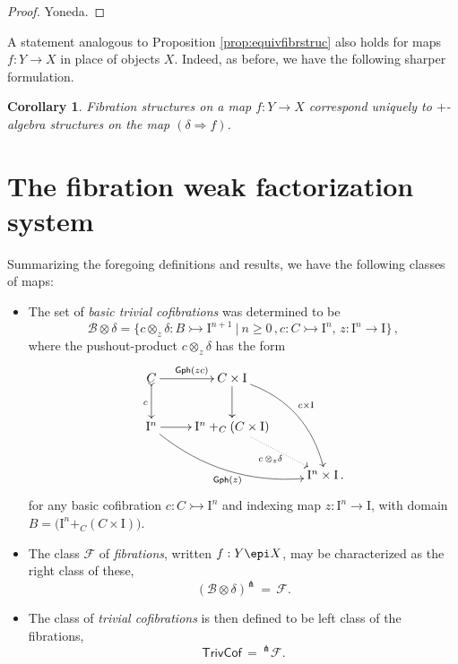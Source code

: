 \documentclass[11pt]{article}
\newcommand{\mono}{\ensuremath{\rightarrowtail}}
\newcommand{\I}{\ensuremath{\mathrm{I}}}
\newtheorem{corollary}[theorem]{Corollary}
\theoremstyle{remark}
\theoremstyle{definition}
\begin{document}
\begin{proof}
Yoneda.
\end{proof}


A statement analogous to Proposition \ref{prop:equivfibrstruc} also holds for maps $f:Y\to X$ in place of objects $X$.  Indeed, as before, we have the following sharper formulation.

\begin{corollary}
Fibration structures on a map $f : Y\to X$ correspond uniquely to $+$-algebra structures on the map $(\delta\Rightarrow{f})$.
\end{corollary}

\section{The fibration weak factorization system}

Summarizing the foregoing definitions and results, we have the following classes of maps:

\begin{itemize}
\item  The set of \emph{basic trivial cofibrations} was determined to be
\begin{equation}\label{eq:basicunbiasedtrivcof}
\mathcal{B}\otimes\delta = \{c \otimes_z \delta : B \mono \I^{n+1}\ |\ n\geq 0\,, c : C\mono \I^n,\, z : \I^n \to \I\}\,,
\end{equation}
where the pushout-product $c\otimes_z \delta$ has the form
\begin{equation}\label{diagram:unbiasedbasicpushoutproduct2}
\xymatrix{
C \ar@{>->}[d]_{c} \ar[r]^{\mathsf{Gph}(zc)} & C\times \I \ar[d] \ar@/^4ex/ [rdd]^{c\times\I}\\
\I^n \ar@/_4ex/ [rrd]_{\mathsf{Gph}(z)} \ar[r] &  \I^n +_C (C\times\I) \ar@{.>}[rd]_{c\, \otimes_z \delta} \\
&& \I^n\times\I\,.
}
\end{equation}
for any basic cofibration $c : C\mono \I^n$ and indexing map $z : \I^n \to \I$, with domain $B = \big(\I^n +_C (C\times\I)\big)$.

\item The class $\mathcal{F}$ of \emph{fibrations}, written $f : Y\epi X$, may be characterized as the right class of these,
\[
(\mathcal{B}\otimes\delta)^\pitchfork\, =\,\mathcal{F}.
\]

\item The class of \emph{trivial cofibrations} is then defined to be left class of the fibrations,
\[
\mathsf{TrivCof}\, =\, ^{\pitchfork}\mathcal{F}.
\]
\end{itemize}
\end{document}
